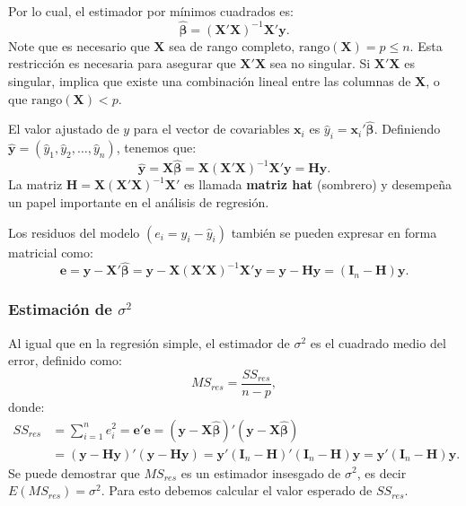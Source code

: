 \documentclass[
]{article}
\begin{document}
Por lo cual, el estimador por mínimos cuadrados es:
\[
\widehat{\boldsymbol \beta}= (\boldsymbol X'\boldsymbol X)^{-1}\boldsymbol X'\boldsymbol y.
\]
Note que es necesario que \(\boldsymbol X\) sea de rango completo, \(\mbox{rango}(\boldsymbol X) = p \leq n\). Esta restricción es necesaria para asegurar que \(\boldsymbol X'\boldsymbol X\) sea no singular. Si \(\boldsymbol X'\boldsymbol X\) es singular, implica que existe una combinación lineal entre las columnas de \(\boldsymbol X\), o que \(\mbox{rango}(\boldsymbol X) < p\).

El valor ajustado de \(y\) para el vector de covariables \(\boldsymbol x_{i}\) es \(\widehat{y}_{i}= \boldsymbol x_{i}'\widehat{\boldsymbol \beta}\). Definiendo \(\widehat{\boldsymbol y}= (\widehat{y}_{1},\widehat{y}_{2},\ldots,\widehat{y}_{n})\), tenemos que:
\[
\widehat{\boldsymbol y}= \boldsymbol X\widehat{\boldsymbol \beta}= \boldsymbol X(\boldsymbol X'\boldsymbol X)^{-1}\boldsymbol X'\boldsymbol y= \boldsymbol H\boldsymbol y.
\]
La matriz \(\boldsymbol H= \boldsymbol X(\boldsymbol X'\boldsymbol X)^{-1}\boldsymbol X'\) es llamada \textbf{matriz hat} (sombrero) y desempeña un papel importante en el análisis de regresión.

Los residuos del modelo \((e_{i}=y_{i}-\widehat{y}_{i})\) también se pueden expresar en forma matricial como:
\[
\boldsymbol e= \boldsymbol y- \boldsymbol X'\widehat{\boldsymbol \beta}= \boldsymbol y- \boldsymbol X(\boldsymbol X'\boldsymbol X)^{-1}\boldsymbol X'\boldsymbol y= \boldsymbol y- \boldsymbol H\boldsymbol y= (\boldsymbol I_{n} - \boldsymbol H)\boldsymbol y.
\]

\hypertarget{estimaciuxf3n-de-sigma2-1}{%
\subsubsection{\texorpdfstring{Estimación de \(\sigma^{2}\)}{Estimación de \textbackslash sigma\^{}\{2\}}}\label{estimaciuxf3n-de-sigma2-1}}

Al igual que en la regresión simple, el estimador de \(\sigma^{2}\) es el cuadrado medio del error, definido como:
\[
MS_{res} = \frac{SS_{res}}{n-p},
\]
donde:
\begin{equation}
\begin{split}
SS_{res} &= \sum_{i=1}^{n}e^{2}_{i} = \boldsymbol e'\boldsymbol e= (\boldsymbol y- \boldsymbol X\widehat{\boldsymbol \beta})'(\boldsymbol y- \boldsymbol X\widehat{\boldsymbol \beta}) \\
&= (\boldsymbol y- \boldsymbol H\boldsymbol y)'(\boldsymbol y- \boldsymbol H\boldsymbol y) = \boldsymbol y'(\boldsymbol I_{n}-\boldsymbol H)'(\boldsymbol I_{n}-\boldsymbol H)\boldsymbol y= \boldsymbol y'(\boldsymbol I_{n} - \boldsymbol H)\boldsymbol y.
\end{split}
\nonumber
\end{equation}
Se puede demostrar que \(MS_{res}\) es un estimador insesgado de \(\sigma^{2}\), es decir \(E(MS_{res})=\sigma^{2}\). Para esto debemos calcular el valor esperado de \(SS_{res}\).
\end{document}
